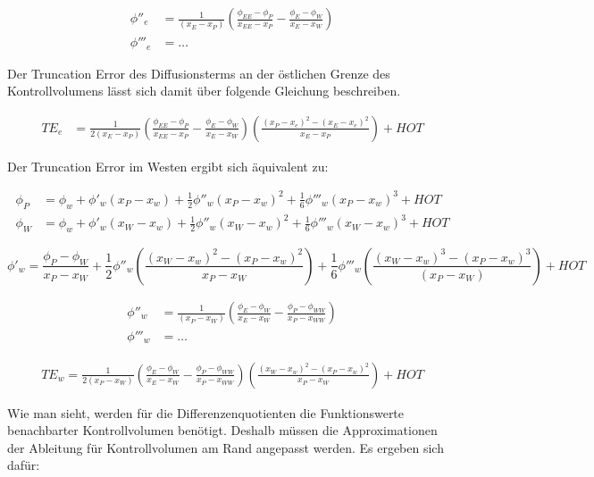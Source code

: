 \documentclass[ngerman,colorback,accentcolor=tud2d]{tudreport}
\begin{document}
\begin{align*}
  \phi''_e &= \frac{1}{(x_E-x_P)}\left({
\frac{\phi_{EE}-\phi_P}{x_{EE}-x_P}-\frac{\phi_E-\phi_W}{x_E-x_W}}\right)\\
 \phi'''_e &= \dots
\end{align*}


Der Truncation Error des Diffusionsterms an der östlichen Grenze des Kontrollvolumens
lässt sich damit über folgende Gleichung beschreiben.

\begin{align*}
  {TE}_e &= \frac{1}{2 (x_E-x_P)}\left({
\frac{\phi_{EE}-\phi_P}{x_{EE}-x_P}-\frac{\phi_E-\phi_W}{x_E-x_W}}\right) \left({\frac{{(x_P-x_e)}^2-{(x_E-x_e)}^2}{x_E-x_P}}\right)+HOT
\end{align*}

Der Truncation Error im Westen ergibt sich äquivalent zu:

\begin{align}
  \phi_P &= \phi_w + \phi'_w(x_P-x_w)+\frac{1}{2}\phi''_w(x_P-x_w)^2
  +\frac{1}{6}\phi'''_w(x_P-x_w)^3+HOT
  \label{eq:taylor_wP}\\
  \phi_W &= \phi_w + \phi'_w(x_W-x_w)+\frac{1}{2}\phi''_w(x_W-x_w)^2
  +\frac{1}{6}\phi'''_w(x_W-x_w)^3+HOT
  \label{eq:taylor_eP}
\end{align}

\begin{equation}
  \phi'_w = \frac{\phi_P-\phi_W}{x_P-x_W}+\frac{1}{2}\phi''_w
\left({\frac{{(x_W-x_w)}^2-{(x_P-x_w)}^2}{x_P-x_W}}\right)+
\frac{1}{6} \phi'''_w \left({\frac{{(x_W-x_w)}^3-{(x_P-x_w)}^3}{(x_P-x_W)}}\right)+HOT
\end{equation}

\begin{align*}
  \phi''_w &= \frac{1}{(x_P-x_W)}\left({
\frac{\phi_{E}-\phi_W}{x_{E}-x_W}-\frac{\phi_P-\phi_{WW}}{x_P-x_{WW}}}\right)\\
 \phi'''_w &= \dots
\end{align*}

\begin{align*}
  TE_w = \frac{1}{2 (x_P-x_W)} \left({
\frac{\phi_{E}-\phi_W}{x_{E}-x_W}-\frac{\phi_P-\phi_{WW}}{x_P-x_{WW}}}\right)
  \left({\frac{{(x_W-x_w)}^2-{(x_P-x_w)}^2}{x_P-x_W}}\right)+HOT
\end{align*}


Wie man sieht, werden für die Differenzenquotienten die Funktionswerte benachbarter
Kontrollvolumen benötigt. Deshalb müssen die Approximationen der Ableitung für
Kontrollvolumen am Rand angepasst werden. Es ergeben sich dafür:
\end{document}

